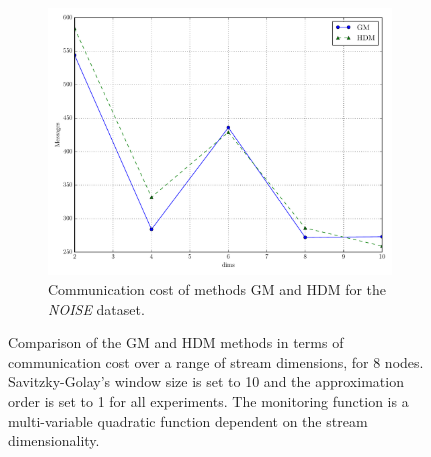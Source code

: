 \begin{figure}[!h]
\begin{subfigure}{0.32\textwidth}
  \includegraphics[width=\linewidth]{img/main_msg_noisyinterweaving_dims.pdf}
  \caption{Communication cost of methods GM and HDM for the \emph{NOISE} dataset.}
\end{subfigure}
\vspace{0.5cm}
\caption{Comparison of the GM and HDM methods in terms of communication cost over a range of stream dimensions, for 8 nodes. Savitzky-Golay's window size is set to 10 and the approximation order is set to 1 for all experiments. The monitoring function is a multi-variable quadratic function dependent on the stream dimensionality.} \label{fig:mainComp-dims}
\end{figure}


